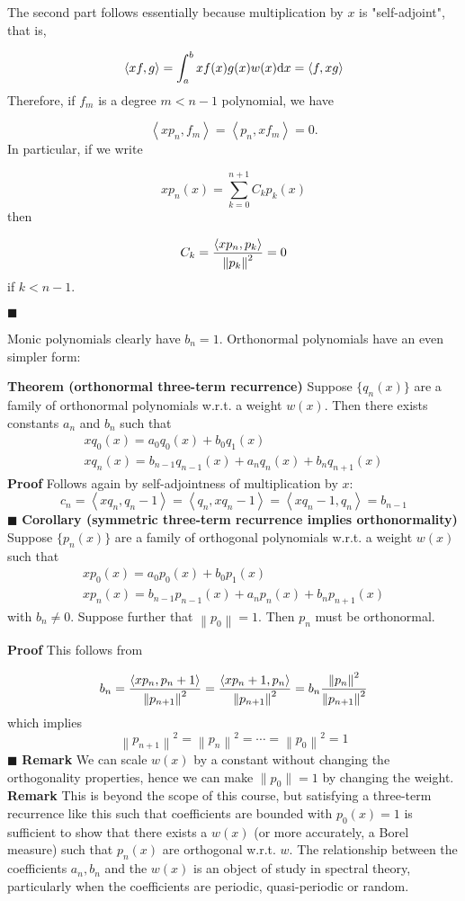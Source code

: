 \documentclass[12pt,landscape]{article}
\def\D{ {\rm d} }
\def\ip<#1>{\left\langle{#1}\right\rangle}
\def\dx{\D x}
\def\norm#1{\left\| #1 \right\|}
\begin{document}
{The second part follows essentially because multiplication by $x$ is "self-adjoint", that is,

\[
\ip<x f, g> = \int_a^b x f(x) g(x) w(x) \dx = \ip<f, x g>
\]
Therefore, if $f_m$ is a degree $m < n-1$ polynomial, we have

\[
\ip<x p_n, f_m> = \ip<p_n, x f_m> = 0.
\]
In particular, if we write

\[
x p_n(x) = \sum_{k=0}^{n+1} C_k p_k(x)
\]
then

\[
C_k = {\ip< x p_n, p_k> \over \norm{p_k}^2} = 0
\]
if $k < n-1$.

\ensuremath{\blacksquare}

Monic polynomials clearly have $b_n = 1$.  Orthonormal polynomials have an even simpler form:

\textbf{Theorem (orthonormal three-term recurrence)} Suppose $\{q_n(x)\}$ are a family of orthonormal polynomials w.r.t. a weight $w(x)$. Then there exists constants $a_n$ and $b_n$ such that
\begin{align*}
x q_0(x) = a_0 q_0(x)  + b_0 q_1(x)\\
x q_n(x) = b_{n-1} q_{n-1}(x) + a_n q_n(x) + b_{n} q_{n+1}(x)
\end{align*}
\textbf{Proof} Follows again by self-adjointness of multiplication by $x$:
\[
c_n = \ip<x q_n, q_{n-1}> = \ip<q_n, x q_{n-1}> = \ip<x q_{n-1}, q_n> = b_{n-1}
\]
\ensuremath{\blacksquare}
\newpage
\textbf{Corollary (symmetric three-term recurrence implies orthonormality)} Suppose $\{p_n(x)\}$ are a family of orthogonal polynomials w.r.t. a weight $w(x)$ such that
\begin{align*}
x p_0(x) = a_0 p_0(x)  + b_0 p_1(x)\\
x p_n(x) = b_{n-1} p_{n-1}(x) + a_n p_n(x) + b_{n} p_{n+1}(x)
\end{align*}
with $b_n \neq 0$. Suppose further that $\norm{p_0} = 1$. Then $p_n$ must be orthonormal.

\textbf{Proof} This follows from

\[
b_n = {\ip<x p_n,p_{n+1}> \over \norm{p_{n+1}}^2} = {\ip<x p_{n+1}, p_n> \over \norm{p_{n+1}}^2} = b_n   {\norm{p_n}^2 \over \norm{p_{n+1}}^2 }
\]
which implies
\[
\norm{p_{n+1}}^2 = \norm{p_n}^2 = \cdots = \norm{p_0}^2 = 1 
\]
\ensuremath{\blacksquare}
\textbf{Remark} We can scale $w(x)$ by a constant without changing the orthogonality properties, hence we can make $\|p_0\| = 1$ by changing the weight.
\newpage
\textbf{Remark} This is beyond the scope of this course, but satisfying a three-term recurrence like this such that coefficients are bounded with $p_0(x) = 1$ is sufficient to show that there exists a $w(x)$ (or more accurately, a Borel measure) such that $p_n(x)$ are orthogonal w.r.t. $w$. The relationship between the coefficients $a_n,b_n$ and the $w(x)$ is an object of study in spectral theory, particularly when the coefficients are periodic, quasi-periodic or random.

}
\end{document}
